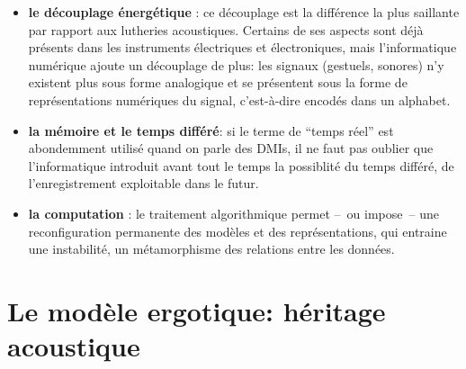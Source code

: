 \vspace{-1em}
\begin{itemize}[noitemsep]
\item \textbf{le découplage énergétique} : ce découplage est la différence la plus saillante par rapport aux lutheries acoustiques. Certains de ses aspects sont déjà présents dans les instruments électriques et électroniques, mais l'informatique numérique ajoute un découplage de plus: les signaux (gestuels, sonores) n'y existent plus sous forme analogique et se présentent sous la forme de représentations numériques du signal, c'est-à-dire encodés dans un alphabet.
\item \textbf{la mémoire et le temps différé}: si le terme de ``temps réel'' est abondemment utilisé quand on parle des \glspl{DMI}, il ne faut pas oublier que l'informatique introduit avant tout le temps la possiblité du temps différé, de l'enregistrement exploitable dans le futur.
\item \textbf{la computation} : le traitement algorithmique permet --~ou impose~-- une reconfiguration permanente des modèles et des représentations, qui entraine une instabilité, un métamorphisme des relations entre les données.
\end{itemize}




\section{Le modèle ergotique: héritage acoustique}


